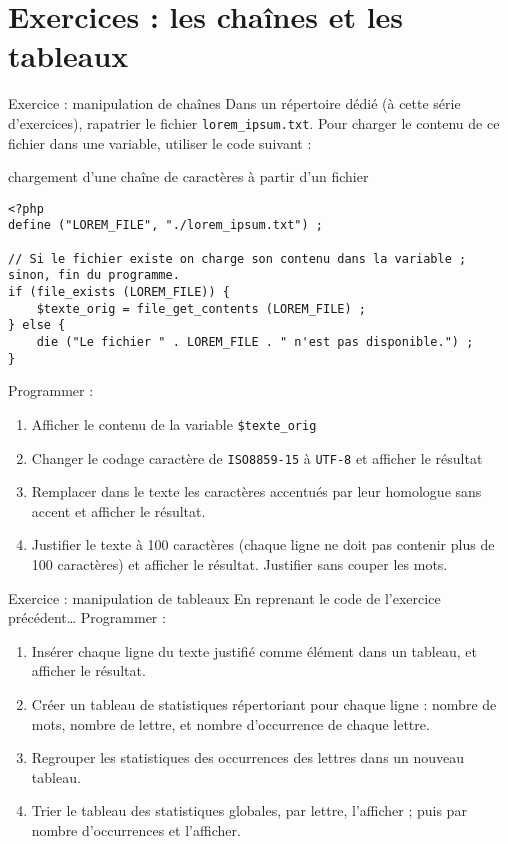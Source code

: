 
\section{Exercices : les chaînes et les tableaux}

\begin{frame}[containsverbatim]{Exercice  : manipulation de chaînes}
	Dans un répertoire dédié (à cette série d’exercices), rapatrier le fichier \texttt{lorem\_ipsum.txt}.
	Pour charger le contenu de ce fichier dans une variable, utiliser le code suivant :
	\begin{block}{chargement d’une chaîne de caractères à partir d’un fichier}
		\begin{lstlisting}
<?php
define ("LOREM_FILE", "./lorem_ipsum.txt") ;

// Si le fichier existe on charge son contenu dans la variable ; sinon, fin du programme.
if (file_exists (LOREM_FILE)) {
	$texte_orig = file_get_contents (LOREM_FILE) ;
} else {
	die ("Le fichier " . LOREM_FILE . " n'est pas disponible.") ;
}
		\end{lstlisting}
	\end{block}
	Programmer :
	\begin{enumerate}
		\item Afficher le contenu de la variable \texttt{\$texte\_orig}
		\item Changer le codage caractère de \texttt{ISO8859-15} à \texttt{UTF-8} et afficher le résultat
		\item Remplacer dans le texte les caractères accentués par leur homologue sans accent et afficher le résultat.
		\item Justifier le texte à 100 caractères (chaque ligne ne doit pas contenir plus de 100 caractères) et afficher le résultat.
		\Pitem Justifier sans couper les mots.
	\end{enumerate}
\end{frame}

\begin{frame}[containsverbatim]{Exercice  : manipulation de tableaux}
	En reprenant le code de l’exercice précédent\ldots
	Programmer :
	\begin{enumerate}
		\item Insérer chaque ligne du texte justifié comme élément dans un tableau, et afficher le résultat.
		\item Créer un tableau de statistiques répertoriant pour chaque ligne : nombre de mots, nombre de lettre, et nombre d’occurrence de chaque lettre.
		\item Regrouper les statistiques des occurrences des lettres dans un nouveau tableau.
		\item Trier le tableau des statistiques globales, par lettre, l’afficher ; puis par nombre d’occurrences et l’afficher.
	\end{enumerate}
\end{frame}

